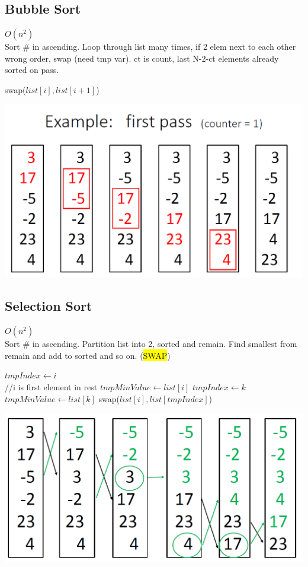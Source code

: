 \subsection{Bubble Sort} $O(n^2)$
\\ Sort \# in ascending. Loop through list many times, if 2 elem next to each other wrong order, swap (need tmp var). ct is count, last N-2-ct elements already sorted on pass.
\begin{algorithmic}
				\State swap($list[i],list[i+1]$)
			\EndIf
		\EndFor
	\EndFor
\end{algorithmic}
\includegraphics[scale=0.13]{bs}
\subsection{Selection Sort} $O(n^2)$
\\ Sort \# in ascending. Partition list into 2, sorted and remain. Find smallest from remain and add to sorted and so on. (\colorbox{Yellow}{SWAP})
\begin{algorithmic}
	\State $tmpIndex \gets i$
	\\//{i is first element in rest}
	\State $tmpMinValue \gets list[i]$
			\State $tmpIndex\gets k$
			\State $tmpMinValue\gets list[k]$
		\EndIf
	\EndFor
		\State swap($list[i],list[tmpIndex]$)
	\EndIf
\EndFor
\end{algorithmic}
\includegraphics[scale=0.13]{ss}
